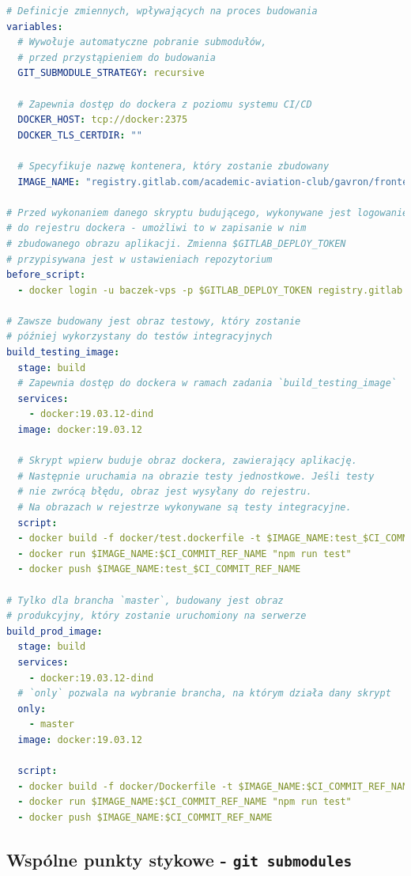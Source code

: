 \begin{lstlisting}[language=yml, label=list:ci_cd_frontend,caption={Plik konfiguracyjny \textit{Gitlab CI}, budujący aplikację kliencką }, basicstyle=\footnotesize\ttfamily]
# Definicje zmiennych, wpływających na proces budowania
variables:
  # Wywołuje automatyczne pobranie submodułów,
  # przed przystąpieniem do budowania 
  GIT_SUBMODULE_STRATEGY: recursive
 
  # Zapewnia dostęp do dockera z poziomu systemu CI/CD
  DOCKER_HOST: tcp://docker:2375
  DOCKER_TLS_CERTDIR: "" 

  # Specyfikuje nazwę kontenera, który zostanie zbudowany 
  IMAGE_NAME: "registry.gitlab.com/academic-aviation-club/gavron/frontend"

# Przed wykonaniem danego skryptu budującego, wykonywane jest logowanie
# do rejestru dockera - umożliwi to w zapisanie w nim 
# zbudowanego obrazu aplikacji. Zmienna $GITLAB_DEPLOY_TOKEN
# przypisywana jest w ustawieniach repozytorium
before_script:
  - docker login -u baczek-vps -p $GITLAB_DEPLOY_TOKEN registry.gitlab.com

# Zawsze budowany jest obraz testowy, który zostanie
# później wykorzystany do testów integracyjnych
build_testing_image:
  stage: build
  # Zapewnia dostęp do dockera w ramach zadania `build_testing_image`
  services:
    - docker:19.03.12-dind
  image: docker:19.03.12
  
  # Skrypt wpierw buduje obraz dockera, zawierający aplikację.
  # Następnie uruchamia na obrazie testy jednostkowe. Jeśli testy
  # nie zwrócą błędu, obraz jest wysyłany do rejestru.
  # Na obrazach w rejestrze wykonywane są testy integracyjne.
  script:
  - docker build -f docker/test.dockerfile -t $IMAGE_NAME:test_$CI_COMMIT_REF_NAME .
  - docker run $IMAGE_NAME:$CI_COMMIT_REF_NAME "npm run test"
  - docker push $IMAGE_NAME:test_$CI_COMMIT_REF_NAME

# Tylko dla brancha `master`, budowany jest obraz 
# produkcyjny, który zostanie uruchomiony na serwerze
build_prod_image:
  stage: build
  services:
	- docker:19.03.12-dind	
  # `only` pozwala na wybranie brancha, na którym działa dany skrypt
  only:
    - master
  image: docker:19.03.12
   
  script:
  - docker build -f docker/Dockerfile -t $IMAGE_NAME:$CI_COMMIT_REF_NAME .
  - docker run $IMAGE_NAME:$CI_COMMIT_REF_NAME "npm run test"
  - docker push $IMAGE_NAME:$CI_COMMIT_REF_NAME
\end{lstlisting}


\subsection{Wspólne punkty stykowe - \texttt{git submodules}}

